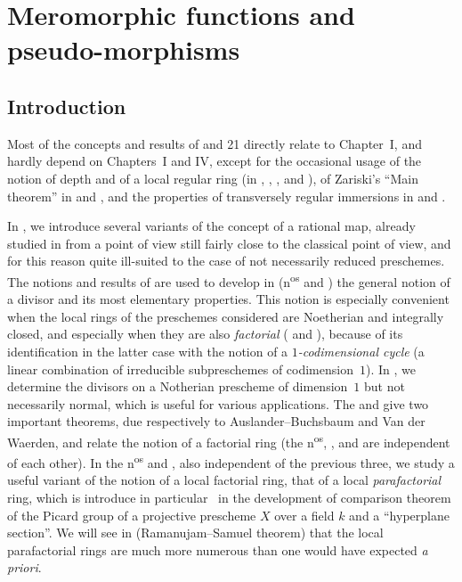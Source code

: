 \section{Meromorphic functions and pseudo-morphisms}
\label{IV.20}

\setcounter{subsection}{-1}
\subsection{Introduction}
\label{IV.20.0}

Most of the concepts and results of \textsection{} and 21 directly relate to Chapter~I, and hardly depend on Chapters~I and IV, except for the occasional usage of the notion of depth and of a local regular ring (in , , , and ), of Zariski's ``Main theorem'' in  and , and the properties of transversely regular immersions in  and .

In , we introduce several variants of the concept of a rational map, already studied in  from a point of view still fairly close to the classical point of view, and for this reason quite ill-suited to the case of not necessarily reduced preschemes.
The notions and results of  are used to develop in  (n\textsuperscript{os} and ) the general notion of a divisor and its most elementary properties.
This notion is especially convenient when the local rings of the preschemes considered are Noetherian and integrally closed, and especially when they are also \emph{factorial} ( and ), because of its identification in the latter case with the notion of a \emph{$1$-codimensional cycle} (a linear combination of irreducible subpreschemes of codimension~$1$).
In ,  we determine the divisors on a Notherian prescheme of dimension~$1$ but not necessarily normal, which is useful for various applications.
The  and  give two important theorems, due respectively to Auslander--Buchsbaum and Van der Waerden, and relate the notion of a factorial ring (the n\textsuperscript{os}, , and  are independent of each other).
In the n\textsuperscript{os} and , also independent of the previous three, we study a useful variant of the notion of a local factorial ring, that of a local \emph{parafactorial} ring, which is introduce in particular~\cite{IV-41} in the development of comparison theorem of the Picard group of a projective prescheme $X$ over a field $k$ and a ``hyperplane section''.
We will see in  (Ramanujam--Samuel theorem) that the local parafactorial rings are much more numerous than one would have expected \emph{a priori}.

